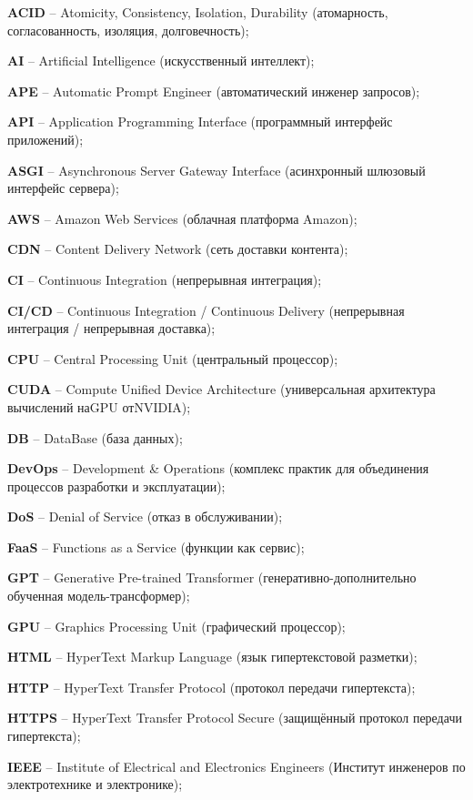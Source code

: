 \par \textbf{ACID} – Atomicity, Consistency, Isolation, Durability (атомарность, согласованность, изоляция, долговечность);
\par \textbf{AI} – Artificial Intelligence (искусственный интеллект);
\par \textbf{APE} – Automatic Prompt Engineer (автоматический инженер запросов);
\par \textbf{API} – Application Programming Interface (программный интерфейс приложений);
\par \textbf{ASGI} – Asynchronous Server Gateway Interface (асинхронный шлюзовый интерфейс сервера);
\par \textbf{AWS} – Amazon Web Services (облачная платформа Amazon);
\par \textbf{CDN} – Content Delivery Network (сеть доставки контента);
\par \textbf{CI} – Continuous Integration (непрерывная интеграция);
 \par \textbf{CI/CD} – Continuous Integration / Continuous Delivery (непрерывная интеграция / непрерывная доставка);
\par \textbf{CPU} – Central Processing Unit (центральный процессор);
\par \textbf{CUDA} – Compute Unified Device Architecture (универсальная архитектура вычислений наGPU отNVIDIA);
\par \textbf{DB} – DataBase (база данных);
\par \textbf{DevOps} – Development \& Operations (комплекс практик для объединения процессов разработки и эксплуатации);
\par \textbf{DoS} – Denial of Service (отказ в обслуживании);
\par \textbf{FaaS} – Functions as a Service (функции как сервис);
\par \textbf{GPT} – Generative Pre-trained Transformer (генеративно-дополнительно обученная модель-трансформер);
\par \textbf{GPU} – Graphics Processing Unit (графический процессор);
\par \textbf{HTML} – HyperText Markup Language (язык гипертекстовой разметки);
\par \textbf{HTTP} – HyperText Transfer Protocol (протокол передачи гипертекста);
\par \textbf{HTTPS} – HyperText Transfer Protocol Secure (защищённый протокол передачи гипертекста);
\par \textbf{IEEE} – Institute of Electrical and Electronics Engineers (Институт инженеров по электротехнике и электронике);
